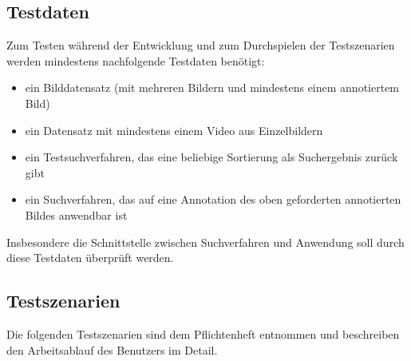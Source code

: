 \subsection{Testdaten}
Zum Testen während der Entwicklung und zum Durchspielen der Testszenarien werden mindestens nachfolgende Testdaten benötigt:
\begin{itemize}
	\item ein Bilddatensatz (mit mehreren Bildern und mindestens einem annotiertem Bild)
	\item ein Datensatz mit mindestens einem Video aus Einzelbildern
	\item ein Testsuchverfahren, das eine beliebige Sortierung als Suchergebnis zurück gibt
	\item ein Suchverfahren, das auf eine Annotation des oben geforderten annotierten Bildes anwendbar ist
\end{itemize}
Insbesondere die Schnittstelle zwischen Suchverfahren und Anwendung soll durch diese Testdaten überprüft werden.

\subsection{Testszenarien}
Die folgenden Testszenarien sind dem Pflichtenheft entnommen und beschreiben den Arbeitsablauf des Benutzers im Detail.

